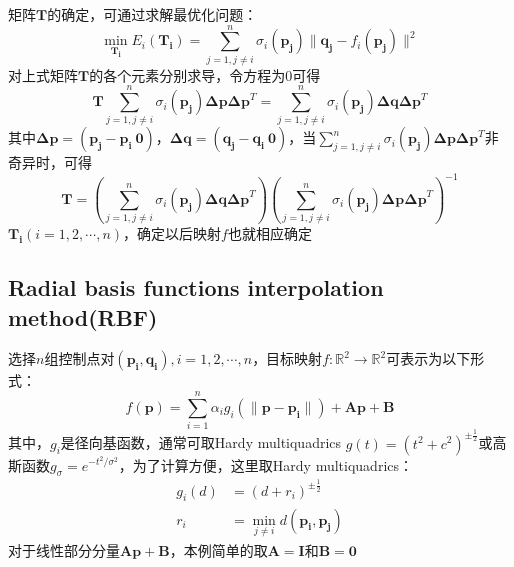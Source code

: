 \documentclass[14pt]{scrartcl} %
\begin{document}
矩阵$\boldsymbol{T}$的确定，可通过求解最优化问题：
\begin{equation}
\min\limits_{\boldsymbol{T_i}} E_i(\boldsymbol{T_i})=\sum\limits^n_{j=1,j\neq i}\sigma_i(\boldsymbol{p_j})\|\boldsymbol{q_j}-f_i(\boldsymbol{p_j})\|^2
\end{equation}
对上式矩阵$\boldsymbol{T}$的各个元素分别求导，令方程为0可得
\begin{equation}
\boldsymbol{T}\sum\limits^n_{j=1,j\neq i}\sigma_i(\boldsymbol{p_j})\boldsymbol{\Delta p}\boldsymbol{\Delta p}^T =\sum\limits^n_{j=1,j\neq i}\sigma_i(\boldsymbol{p_j})\boldsymbol{\Delta q}\boldsymbol{\Delta p}^T
\end{equation}
其中$\boldsymbol{\Delta p}=(\boldsymbol{p_j}-\boldsymbol{p_i}\ \boldsymbol{0})$，$\boldsymbol{\Delta q}=(\boldsymbol{q_j}-\boldsymbol{q_i}\ \boldsymbol{0})$，当$\sum\limits^n_{j=1,j\neq i}\sigma_i(\boldsymbol{p_j})\boldsymbol{\Delta p}\boldsymbol{\Delta p}^T$非奇异时，可得
\begin{equation}
\boldsymbol{T}= (\sum\limits^n_{j=1,j\neq i}\sigma_i(\boldsymbol{p_j})\boldsymbol{\Delta q}\boldsymbol{\Delta p}^T)(\sum\limits^n_{j=1,j\neq i}\sigma_i(\boldsymbol{p_j})\boldsymbol{\Delta p}\boldsymbol{\Delta p}^T)^{-1}
\end{equation}
$\boldsymbol{T_i}(i=1,2,\cdots,n)$，确定以后映射$f$也就相应确定

\subsection{Radial basis functions interpolation method(RBF)\cite{arad1995image}}
选择$n$组控制点对$(\boldsymbol{p_i},\boldsymbol{q_i}),i=1,2,\cdots,n$，目标映射$f:\mathbb{R}^2\rightarrow \mathbb{R}^2$可表示为以下形式：
\begin{equation}
f(\boldsymbol{p})=\sum\limits_{i=1}^n\alpha_i g_i(\|\boldsymbol{p}-\boldsymbol{p_i}\|)+\boldsymbol{A}\boldsymbol{p}+\boldsymbol{B}
\end{equation}
其中，$g_i$是径向基函数，通常可取Hardy multiquadrics $g(t)=(t^2+c^2)^{\pm\frac{1}{2}}$或高斯函数$g_\sigma=e^{-t^2/\sigma^2}$，为了计算方便，这里取Hardy multiquadrics：
\begin{equation}
\begin{aligned}
g_i(d) & =(d+r_i)^{\pm\frac{1}{2}}\\
r_i & =\mathop{\min}\limits_{j\neq i} d(\boldsymbol{p_i},\boldsymbol{p_j})
\end{aligned}
\end{equation}
对于线性部分分量$\boldsymbol{A}\boldsymbol{p}+\boldsymbol{B}$，本例简单的取$\boldsymbol{A}=\boldsymbol{I}$和$\boldsymbol{B}=\boldsymbol{0}$
\end{document}
